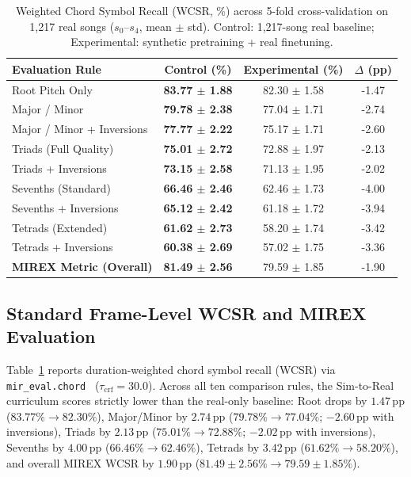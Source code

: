 \documentclass{article}
\begin{document}
\begin{table}[t]
\centering
\footnotesize
\renewcommand{\arraystretch}{0.88}
\setlength{\tabcolsep}{2.8pt}
\vspace{-8pt}
\caption{Weighted Chord Symbol Recall (WCSR, \%) across 5-fold cross-validation on 1,217 real songs ($s_0$--$s_4$, mean $\pm$ std). Control: 1,217-song real baseline; Experimental: synthetic pretraining + real finetuning.}
\label{tab:wcsr_mirex}
\vspace{1pt}
\begin{tabular*}{\columnwidth}{@{\extracolsep{\fill}}lccc@{}}
\toprule
\textbf{Evaluation Rule} & \textbf{Control (\%)} & \textbf{Experimental (\%)} & \textbf{$\Delta$ (pp)} \\
\midrule
  Root Pitch Only                  & \textbf{83.77 $\pm$ 1.88} & 82.30 $\pm$ 1.58 & -1.47 \\
  Major / Minor                    & \textbf{79.78 $\pm$ 2.38} & 77.04 $\pm$ 1.71 & -2.74 \\
  Major / Minor + Inversions       & \textbf{77.77 $\pm$ 2.22} & 75.17 $\pm$ 1.71 & -2.60 \\
  Triads (Full Quality)            & \textbf{75.01 $\pm$ 2.72} & 72.88 $\pm$ 1.97 & -2.13 \\
  Triads + Inversions              & \textbf{73.15 $\pm$ 2.58} & 71.13 $\pm$ 1.95 & -2.02 \\
  Sevenths (Standard)              & \textbf{66.46 $\pm$ 2.46} & 62.46 $\pm$ 1.73 & -4.00 \\
  Sevenths + Inversions            & \textbf{65.12 $\pm$ 2.42} & 61.18 $\pm$ 1.72 & -3.94 \\
  Tetrads (Extended)               & \textbf{61.62 $\pm$ 2.73} & 58.20 $\pm$ 1.74 & -3.42 \\
  Tetrads + Inversions             & \textbf{60.38 $\pm$ 2.69} & 57.02 $\pm$ 1.75 & -3.36 \\
\midrule
  \textbf{MIREX Metric (Overall)}  & \textbf{81.49 $\pm$ 2.56} & 79.59 $\pm$ 1.85 & -1.90 \\
\bottomrule
\end{tabular*}
\end{table}

\subsection{Standard Frame-Level WCSR and MIREX Evaluation}\label{subsec:wcsr_mirex}

Table~\ref{tab:wcsr_mirex} reports duration-weighted chord symbol recall (WCSR) via \texttt{mir\_eval.chord}~\cite{raffel2014mireval} ($\tau_{\text{crf}} = 30.0$). Across all ten comparison rules, the Sim-to-Real curriculum scores strictly lower than the real-only baseline: Root drops by $1.47\,\text{pp}$ ($83.77\% \!\to\! 82.30\%$), Major/Minor by $2.74\,\text{pp}$ ($79.78\% \!\to\! 77.04\%$; $-2.60\,\text{pp}$ with inversions), Triads by $2.13\,\text{pp}$ ($75.01\% \!\to\! 72.88\%$; $-2.02\,\text{pp}$ with inversions), Sevenths by $4.00\,\text{pp}$ ($66.46\% \!\to\! 62.46\%$), Tetrads by $3.42\,\text{pp}$ ($61.62\% \!\to\! 58.20\%$), and overall MIREX WCSR by $1.90\,\text{pp}$ ($81.49 \pm 2.56\% \!\to\! 79.59 \pm 1.85\%$).
\end{document}
